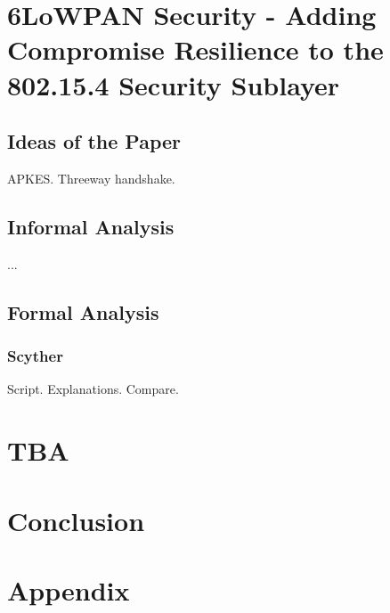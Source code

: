 \chapter{6LoWPAN Security - Adding Compromise Resilience to the 802.15.4 Security Sublayer}
\label{chp:krentz-6lowpan}


\section{Ideas of the Paper}

APKES. Threeway handshake.

\section{Informal Analysis}

...

\section{Formal Analysis}

\subsection{Scyther}


Script. Explanations. Compare.







\chapter{TBA}

\chapter{Conclusion}


\chapter{Appendix}